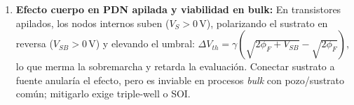 \begin{enumerate}[leftmargin=1.5em,itemsep=0.04em,parsep=0pt,topsep=0.1em]
\item \textbf{Efecto cuerpo en PDN apilada y viabilidad en bulk:} En transistores apilados, los nodos internos suben ($V_S > 0\,\text{V}$), polarizando el sustrato en reversa ($V_{SB}>0\,\text{V}$) y elevando el umbral: $\Delta V_{th} = \gamma(\sqrt{2\phi_F + V_{SB}} - \sqrt{2\phi_F})$, lo que merma la sobremarcha y retarda la evaluación. Conectar sustrato a fuente anularía el efecto, pero es inviable en procesos \textit{bulk} con pozo/sustrato común; mitigarlo exige triple-well o SOI.

\end{enumerate}

